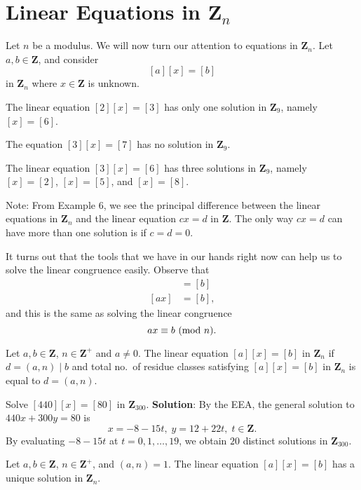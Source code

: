 \section{Linear Equations in \texorpdfstring{$ \mathbf{Z}_n $}{Zn}}
Let $ n $ be a modulus. We will now turn our attention to equations
in $ \mathbf{Z}_n $. Let $ a,b\in\mathbf{Z} $, and consider
\[ [a][x]=[b] \]
in $ \mathbf{Z}_n $ where $ x\in\mathbf{Z} $ is unknown.
\begin{Example}{}{}
    The linear equation $ [2][x]=[3] $ has only one solution in $ \mathbf{Z}_9 $,
    namely $ [x]=[6] $.
\end{Example}
\begin{Example}{}{}
    The equation $ [3][x]=[7] $ has no solution in $ \mathbf{Z}_9 $.
\end{Example}
\begin{Example}{}{}
    The linear equation $ [3][x]=[6] $ has three solutions in $ \mathbf{Z}_9 $, namely
    $ [x]=[2] $, $ [x]=[5] $, and $ [x]=[8] $.
\end{Example}
Note: From Example 6, we see the principal difference between the linear
equations in $ \mathbf{Z}_n $ and the linear equation $cx = d$ in $ \mathbf{Z} $. The only way $cx = d$ can
have more than one solution is if $c = d = 0$.

It turns out that the tools that we have in our hands right now can help us to
solve the linear congruence easily. Observe that
\begin{align*}
    [a][x] & =[b]  \\
    [ax]   & =[b],
\end{align*}
and this is the same as solving the linear congruence
\[ ax\equiv b\ (\mathrm{mod}\ n). \]
\begin{Proposition}{}{}
    Let $ a,b\in\mathbf{Z} $, $ n\in\mathbf{Z}^+ $ and $ a\ne 0 $. The linear equation
    $ [a][x]=[b] $ in $ \mathbf{Z}_n $ if $ d=(a,n)\mid b $ and total no.\ of residue classes
    satisfying $ [a][x]=[b] $ in $ \mathbf{Z}_n $ is equal to $ d=(a,n) $.
\end{Proposition}
\begin{Example}{}{}
    Solve $ [440][x]=[80] $ in $ \mathbf{Z}_{300} $.
    \tcblower{}
    \textbf{Solution}: By the EEA, the general solution to $ 440x+300y=80 $ is
    \[ x=-8-15t,\; y=12+22t,\; t\in\mathbf{Z}. \]
    By evaluating $ -8-15t $ at $ t=0,1,\ldots,19 $, we obtain $ 20 $ distinct solutions in $ \mathbf{Z}_{300} $.
\end{Example}
\begin{Proposition}{}{}
    Let $ a,b\in\mathbf{Z} $, $ n\in\mathbf{Z}^+ $, and $ (a,n)=1 $. The linear equation
    $ [a][x]=[b] $ has a unique solution in $ \mathbf{Z}_n $.
\end{Proposition}
